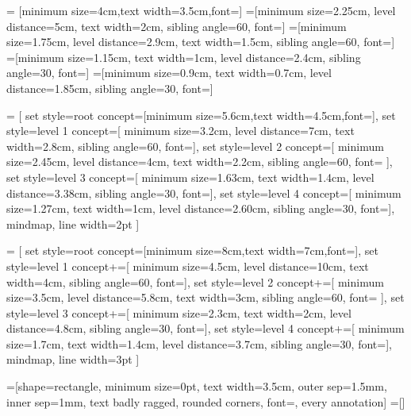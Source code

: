 =   [minimum size=4cm,text width=3.5cm,font=\large]
=[minimum size=2.25cm,
                             level distance=5cm,
                             text width=2cm,
                             sibling angle=60,
                             font=\small]
=[minimum size=1.75cm,%
                             level distance=2.9cm,%
                             text width=1.5cm,%
                             sibling angle=60,%
                             font=\footnotesize]
=[minimum size=1.15cm,%
                             text width=1cm,%
                             level distance=2.4cm,%
                             sibling angle=30,%
                             font=\tiny]
=[minimum size=0.9cm,%
                             text width=0.7cm,
                             level distance=1.85cm,%
                             sibling angle=30,%
                             font=\tiny]
  
=
  [%
  set style={{root concept}=[minimum size=5.6cm,text width=4.5cm,font=\Large]},
  set style={{level 1 concept}=[%
    minimum size=3.2cm,
    level distance=7cm,
    text width=2.8cm,
    sibling angle=60,
    font=]},%
  set style={{level 2 concept}=[%
    minimum size=2.45cm,%
    level distance=4cm,%
    text width=2.2cm,%
    sibling angle=60,%
    font=\small%
    ]},%
  set style={{level 3 concept}=[%
    minimum size=1.63cm,%
    text width=1.4cm,%
    level distance=3.38cm,%
    sibling angle=30,%
    font=\scriptsize]},%
  set style={{level 4 concept}=[%
    minimum size=1.27cm,%
    text width=1cm,
    level distance=2.60cm,%
    sibling angle=30,%
    font=\tiny]},%
  mindmap,%
  line width=2pt
  ]
  
=
  [%
  set style={{root concept}=[minimum size=8cm,text width=7cm,font=\huge]},
  set style={{level 1 concept}+=[%
    minimum size=4.5cm,
    level distance=10cm,
    text width=4cm,
    sibling angle=60,
    font=\large]},%
  set style={{level 2 concept}+=[%
    minimum size=3.5cm,%
    level distance=5.8cm,%
    text width=3cm,%
    sibling angle=60,%
    font=%
    ]},%
  set style={{level 3 concept}+=[%
    minimum size=2.3cm,%
    text width=2cm,%
    level distance=4.8cm,%
    sibling angle=30,%
    font=\footnotesize]},%
  set style={{level 4 concept}+=[%
    minimum size=1.7cm,%
    text width=1.4cm,
    level distance=3.7cm,%
    sibling angle=30,%
    font=\scriptsize]},%
  mindmap,%
  line width=3pt
  ]
  


=[shape=rectangle,
                        minimum size=0pt,
                        text width=3.5cm,
                        outer sep=1.5mm,
                        inner sep=1mm,
                        text badly ragged,
                        rounded corners,
                        font=\tiny,
                        every annotation]
=[]

\endinput

